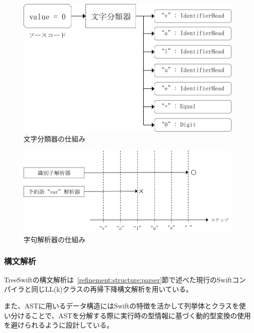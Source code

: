 \begin{figure}
    \begin{center}
        \includegraphics[scale=0.8]{./img/character_classifier.png}
        \caption{文字分類器の仕組み}
        \label{img:character-classifier}
    \end{center}
\end{figure}

\begin{figure}
    \begin{center}
        \includegraphics[scale=0.8]{./img/lexical_analyzer.png}
        \caption{字句解析器の仕組み}
        \label{img:lexical-analyzer}
    \end{center}
\end{figure}

\subsubsection{構文解析}

TreeSwiftの構文解析は~\ref{refinement:structure:parser}節で述べた現行のSwiftコンパイラと同じLL(k)クラスの再帰下降構文解析を用いている。

また、ASTに用いるデータ構造にはSwiftの特徴を活かして列挙体とクラスを使い分けることで、ASTを分解する際に実行時の型情報に基づく動的型変換の使用を避けられるように設計している。

